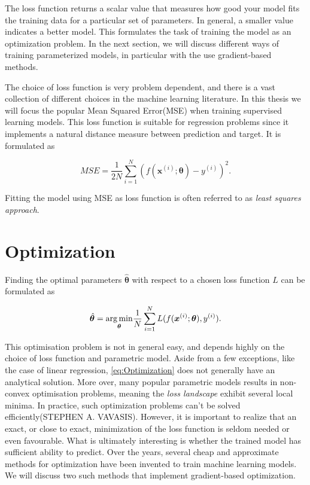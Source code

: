 The loss function returns a scalar value that measures how good your model fits the training data for a particular set of parameters. In general, a smaller value indicates a better model. This formulates the task of training the model as an optimization problem. In the next section, we will discuss different ways of training parameterized models, in particular with the use gradient-based methods.

The choice of loss function is very problem dependent, and there is a vast collection of different choices in the machine learning literature. In this thesis we will focus the popular Mean Squared Error(MSE) when training supervised learning models. This loss function is suitable for regression problems since it implements a natural distance measure between prediction and target. It is formulated as

\begin{equation}\label{eq:MSE}
    MSE = \frac{1}{2N}\sum_{i=1}^{N} (f(\boldsymbol{x}^{(i)}; \boldsymbol{\theta}) - y^{(i)})^2.
\end{equation}

Fitting the model using MSE as loss function is often referred to as \emph{least squares approach}.




\section{Optimization}\label{sec:Optimization}
Finding the optimal parameters $\hat{\boldsymbol{\theta}}$ with respect to a chosen loss function $L$ can be formulated as

\begin{equation}\label{eq:Optimization}
    \hat{\boldsymbol{\theta}} = \underset{\boldsymbol{\theta}}{\operatorname*{arg\,min}} \frac{1}{N}\sum_{i=1}^{N} L(f(\boldsymbol{x}^{(i)}; \boldsymbol{\theta}) , y^{(i)}).
\end{equation}

This optimisation problem is not in general easy, and depends highly on the choice of loss function and parametric model. Aside from a few exceptions, like the case of linear regression, \autoref{eq:Optimization} does not generally have an analytical solution. More over, many popular parametric models results in non-convex optimisation problems, meaning the \emph{loss landscape} exhibit several local minima. In practice, such optimization problems can't be solved efficiently(STEPHEN A. VAVASIS). However, it is important to realize that an exact, or close to exact, minimization of the loss function is seldom needed or even favourable. What is ultimately interesting is whether the trained model has sufficient ability to predict. Over the years, several cheap and approximate methods for optimization have been invented to train machine learning models. We will discuss two such methods that implement gradient-based optimization. 

